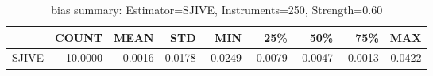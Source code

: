 \begin{table}[ht]
\centering
\caption{bias summary: Estimator=SJIVE, Instruments=250, Strength=0.60}
\begin{tabular}{lrrrrrrrr}
\toprule
 & COUNT & MEAN & STD & MIN & 25\% & 50\% & 75\% & MAX \\
\midrule
SJIVE & 10.0000 & -0.0016 & 0.0178 & -0.0249 & -0.0079 & -0.0047 & -0.0013 & 0.0422 \\
\bottomrule
\end{tabular}
\end{table}
